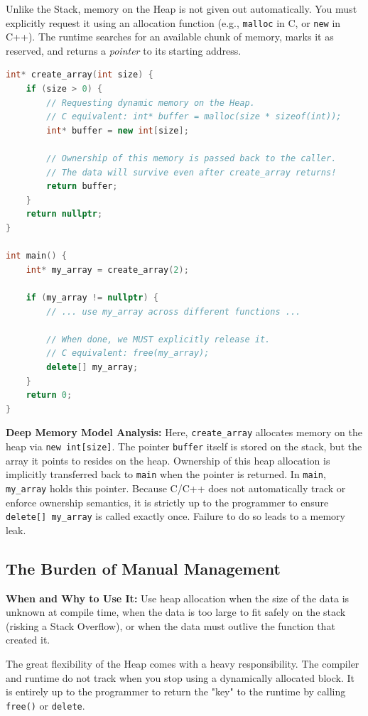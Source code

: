 Unlike the Stack, memory on the Heap is not given out automatically. You must explicitly request it using an allocation function (e.g., \texttt{malloc} in C, or \texttt{new} in C++). The runtime searches for an available chunk of memory, marks it as reserved, and returns a \textit{pointer} to its starting address.

\begin{lstlisting}[language=C++]
int* create_array(int size) {
    if (size > 0) {
        // Requesting dynamic memory on the Heap.
        // C equivalent: int* buffer = malloc(size * sizeof(int));
        int* buffer = new int[size]; 
        
        // Ownership of this memory is passed back to the caller.
        // The data will survive even after create_array returns!
        return buffer; 
    }
    return nullptr;
}

int main() {
    int* my_array = create_array(2);
    
    if (my_array != nullptr) {
        // ... use my_array across different functions ...
        
        // When done, we MUST explicitly release it.
        // C equivalent: free(my_array);
        delete[] my_array; 
    }
    return 0;
}
\end{lstlisting}

\textbf{Deep Memory Model Analysis:}
Here, \texttt{create\_array} allocates memory on the heap via \texttt{new int[size]}. The pointer \texttt{buffer} itself is stored on the stack, but the array it points to resides on the heap. Ownership of this heap allocation is implicitly transferred back to \texttt{main} when the pointer is returned. In \texttt{main}, \texttt{my\_array} holds this pointer. Because C/C++ does not automatically track or enforce ownership semantics, it is strictly up to the programmer to ensure \texttt{delete[] my\_array} is called exactly once. Failure to do so leads to a memory leak.

\subsection{The Burden of Manual Management}
\textbf{When and Why to Use It:} Use heap allocation when the size of the data is unknown at compile time, when the data is too large to fit safely on the stack (risking a Stack Overflow), or when the data must outlive the function that created it.

The great flexibility of the Heap comes with a heavy responsibility. The compiler and runtime do not track when you stop using a dynamically allocated block. It is entirely up to the programmer to return the "key" to the runtime by calling \texttt{free()} or \texttt{delete}. 


